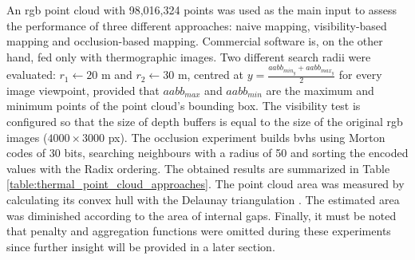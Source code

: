An \acrshort{rgb} point cloud with 98,016,324 points was used as the main input to assess the performance of three different approaches: naive mapping, visibility-based mapping and occlusion-based mapping. Commercial software is, on the other hand, fed only with thermographic images. Two different search radii were evaluated: $r_1 \gets 20$ \si{\meter} and $r_2 \gets 30$ \si{\meter}, centred at $y = \frac{\textit{aabb}_{\textit{min}_{y}} + \textit{aabb}_{\textit{max}_{y}}}{2}$ for every image viewpoint, provided that $\textit{aabb}_{\textit{max}}$ and $\textit{aabb}_{\textit{min}}$ are the maximum and minimum points of the point cloud's bounding box. The visibility test is configured so that the size of depth buffers is equal to the size of the original \acrshort{rgb} images ($4000 \times 3000$ px). The occlusion experiment builds \acrshort{bvh}s using Morton codes of 30 bits, searching neighbours with a radius of 50 and sorting the encoded values with the Radix ordering. The obtained results are summarized in Table \ref{table:thermal_point_cloud_approaches}. The point cloud area was measured by calculating its convex hull with the Delaunay triangulation \cite{shewchuk_delaunay_2002}. The estimated area was diminished according to the area of internal gaps. Finally, it must be noted that penalty and aggregation functions were omitted during these experiments since further insight will be provided in a later section. 

